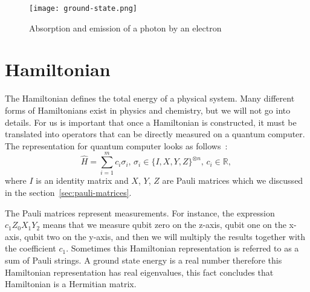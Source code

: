 
\begin{figure}[H]
    \centering
    \texttt{[image: ground-state.png]}
    \caption{Absorption and emission of a photon by an electron~\cite{img:ground-state}}
\end{figure}

\section{Hamiltonian}
The Hamiltonian defines the total energy of a physical system. Many different forms of Hamiltonians exist in physics and chemistry, but we will not go into details. For us is important that once a Hamiltonian is constructed, it must be translated into operators that can be directly measured on a quantum computer. The representation for quantum computer looks as follows~\cite{vqe_method}:
\begin{equation*}
\hat{H} = \sum_{i=1}^{m}c_i\sigma_i \text{, } \sigma_i \in \{I, X, Y, Z\}^{\otimes n}\text{, } c_i \in \mathbb{R} \text{, }
\end{equation*}
where $I$ is an identity matrix and $X$, $Y$, $Z$ are Pauli matrices which we discussed in the section~\ref{sec:pauli-matrices}.

The Pauli matrices represent measurements. For instance, the expression $c_{1}Z_{0}X_{1}Y_{2}$ means that we measure qubit zero on the z-axis, qubit one on the x-axis, qubit two on the y-axis, and then we will multiply the results together with the coefficient $c_{1}$. Sometimes this Hamiltonian representation is referred to as a sum of Pauli strings. A ground state energy is a real number therefore this Hamiltonian representation has real eigenvalues, this fact concludes that Hamiltonian is a Hermitian matrix.